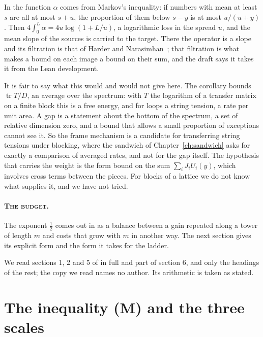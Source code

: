In \cite{Rub26} the function $\alpha$ comes from Markov's inequality: if numbers with mean at least $s$ are all at most $s+u$, the proportion of them below $s-y$ is at most $u/(u+y)$. Then $4\int_0^L\alpha=4u\log(1+L/u)$, a logarithmic loss in the spread $u$, and the mean slope of the sources is carried to the target. There the operator is a slope and its filtration is that of Harder and Narasimhan~\cite{HN75}; that filtration is what makes a bound on each image a bound on their sum, and the draft says it takes it from the Lean development.

It is fair to say what this would and would not give here. The corollary bounds $\operatorname{tr}T/D$, an average over the spectrum: with $T$ the logarithm of a transfer matrix on a finite block this is a free energy, and for loops a string tension, a rate per unit area. A gap is a statement about the bottom of the spectrum, a set of relative dimension zero, and a bound that allows a small proportion of exceptions cannot see it. So the frame mechanism is a candidate for transferring string tensions under blocking, where the sandwich of Chapter~\ref{ch:sandwich} asks for exactly a comparison of averaged rates, and not for the gap itself. The hypothesis that carries the weight is the form bound on the sum $\sum_iJ_iU_i(y)$, which involves cross terms between the pieces. For blocks of a lattice we do not know what supplies it, and we have not tried.

\paragraph{\normalfont\scshape The budget.} The exponent $\frac12$ comes out in \cite{DLCL} as a balance between a gain repeated along a tower of length $m$ and costs that grow with $m$ in another way. The next section gives its explicit form and the form it takes for the ladder.

We read sections 1, 2 and 5 of \cite{DLCL} in full and part of section 6, and only the headings of the rest; the copy we read names no author. Its arithmetic is taken as stated.

\section{The inequality (M) and the three scales}\label{sec:ineqM}


